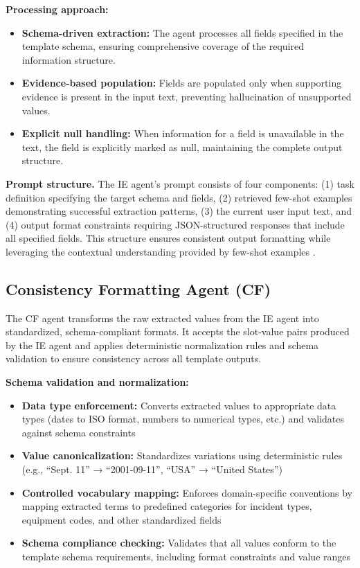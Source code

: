 \textbf{Processing approach:}
\begin{itemize}
    \item \textbf{Schema-driven extraction:} The agent processes all fields specified in the template schema, ensuring comprehensive coverage of the required information structure.
    \item \textbf{Evidence-based population:} Fields are populated only when supporting evidence is present in the input text, preventing hallucination of unsupported values.
    \item \textbf{Explicit null handling:} When information for a field is unavailable in the text, the field is explicitly marked as null, maintaining the complete output structure.
\end{itemize}

\textbf{Prompt structure.} The IE agent's prompt consists of four components: (1) task definition specifying the target schema and fields, (2) retrieved few-shot examples demonstrating successful extraction patterns, (3) the current user input text, and (4) output format constraints requiring JSON-structured responses that include all specified fields. This structure ensures consistent output formatting while leveraging the contextual understanding provided by few-shot examples \cite{zhang2023sgptod}.

\subsection{Consistency Formatting Agent (CF)}
\label{subsec:cf-agent}

The CF agent transforms the raw extracted values from the IE agent into standardized, schema-compliant formats. It accepts the slot-value pairs produced by the IE agent and applies deterministic normalization rules and schema validation to ensure consistency across all template outputs.

\textbf{Schema validation and normalization:}
\begin{itemize}
    \item \textbf{Data type enforcement:} Converts extracted values to appropriate data types (dates to ISO format, numbers to numerical types, etc.) and validates against schema constraints
    \item \textbf{Value canonicalization:} Standardizes variations using deterministic rules (e.g., ``Sept. 11'' → ``2001-09-11'', ``USA'' → ``United States'')
    \item \textbf{Controlled vocabulary mapping:} Enforces domain-specific conventions by mapping extracted terms to predefined categories for incident types, equipment codes, and other standardized fields
    \item \textbf{Schema compliance checking:} Validates that all values conform to the template schema requirements, including format constraints and value ranges
\end{itemize}

